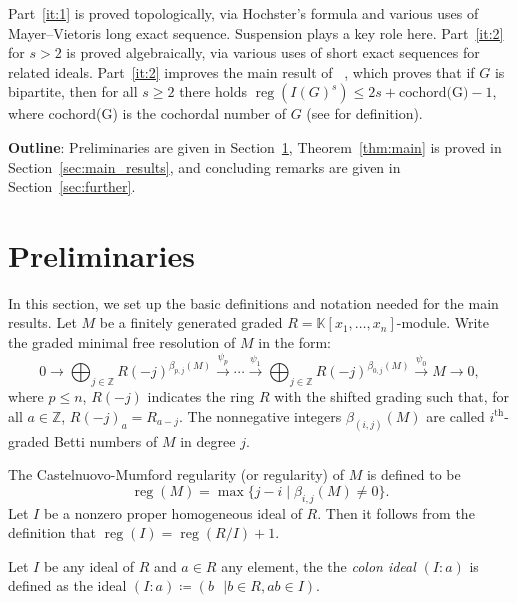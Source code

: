 \documentclass[ALCO,published]{cedram}
\numberwithin{equation}{section}
\newcommand \reg{\operatorname{reg}}
\newcommand \K{\mathbb{K}}
\begin{document}
Part~\ref{it:1} is proved topologically, via Hochster's formula and various uses of Mayer--Vietoris long exact sequence. Suspension plays a key role here. Part~\ref{it:2} for $s>2$ is proved algebraically, via various uses of short exact sequences for related ideals. Part~\ref{it:2} improves the main result of ~\cite{jayanthan}, which proves that if $G$ is bipartite, then for all $s\geq 2$  there holds $\reg(I(G)^s) \leq 2s+\text{cochord(G)}-1$, where cochord(G) is the cochordal number of $G$ (see \cite{jayanthan} for definition).

\textbf{Outline}: Preliminaries are given in Section~\ref{pre}, Theorem~\ref{thm:main} is proved in Section~\ref{sec:main_results}, and concluding remarks are given in Section~\ref{sec:further}.


\section{Preliminaries}\label{pre}
  In this section, we set up the basic definitions and notation needed for the main results. Let $M$ be a finitely generated graded $R=\K[x_1,\ldots,x_n]$-module.
Write the graded minimal free resolution of $M$ in the form:
\[
  0 \longrightarrow \bigoplus_{j \in \mathbb{Z}} R(-j)^{\beta_{p,j}(M)}
\overset{\psi_{p}}{\longrightarrow} \cdots \overset{\psi_1}{\longrightarrow}
\bigoplus_{j \in \mathbb{Z}} R(-j)^{\beta_{0,j}(M)}
\overset{\psi_0}{\longrightarrow} M\longrightarrow 0,
 \]
 where $p \leq n$, $R(-j)$ indicates the ring $R$ with the
shifted grading such that, for all $a \in \mathbb{Z}$, $R(-j)_{a}=R_{a-j}$.
The nonnegative integers $\beta_{(i,j)}(M)$ are called 
$i^{\text{th}}$-graded Betti numbers of $M$ in degree $j$.

The Castelnuovo-Mumford regularity (or regularity) of $M$ is defined to be
\[
 \reg(M)=\max\{j-i \mid \beta_{i,j}(M)\neq 0\}.\label{def_reg}
\]
  Let $I$ be a nonzero proper homogeneous ideal of $R$.
Then it follows from the definition
that $\reg(I) = \reg(R/I)+1.$

Let $I$ be any ideal of $R$ and $a\in R$ any element, the the \emph{colon ideal} $(I:a)$ is defined as the ideal $(I:a)\coloneqq (b \text{ } | b\in R, ab\in I)$.
\end{document}
